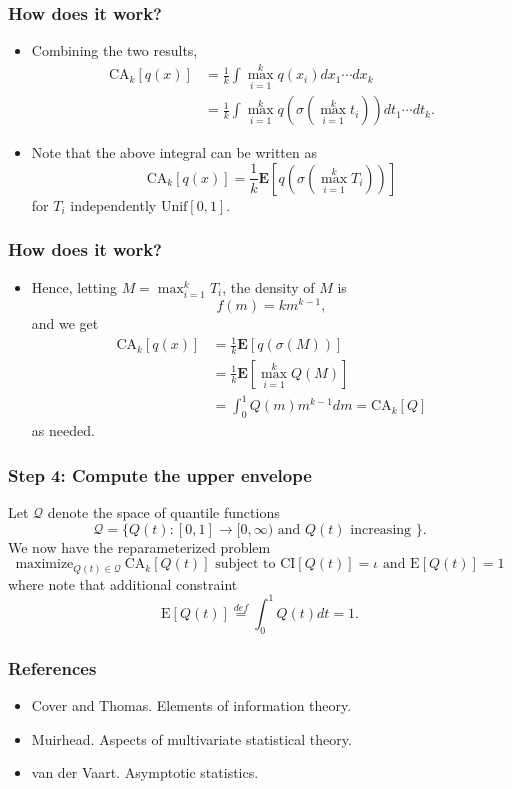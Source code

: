 \documentclass{beamer}
\newcommand{\E}{\textbf{E}}
\begin{document}
\begin{frame}
\frametitle{How does it work?}
\begin{itemize}
\item Combining the two results,
\begin{align*}
\text{CA}_k[q(x)] &= \frac{1}{k}\int \max_{i=1}^k q(x_i) dx_1 \cdots dx_k 
\\&= \frac{1}{k}\int \max_{i=1}^k q(\sigma(\max_{i=1}^k t_i)) dt_1 \cdots dt_k.
\end{align*}
\item Note that the above integral can be written as
\[
\text{CA}_k[q(x)] = \frac{1}{k}\E[q(\sigma(\max_{i=1}^k T_i))]
\]
for $T_i$ independently $\text{Unif}[0,1]$.
\end{itemize}
\end{frame}

\begin{frame}
\frametitle{How does it work?}
\begin{itemize}
\item Hence, letting $M = \max_{i=1}^k T_i$, the density of $M$ is
\[
f(m) = k m^{k-1},
\]
and we get
\begin{align*}
\text{CA}_k[q(x)] &= \frac{1}{k}\E[q(\sigma(M))]
\\&= \frac{1}{k}\E[\max_{i=1}^k Q(M)]
\\&= \int_0^1 Q(m) m^{k-1}dm  = \text{CA}_k[Q]
\end{align*}
as needed.
\end{itemize}
\end{frame}

\begin{frame}
\frametitle{Step 4: Compute the upper envelope}
Let $\mathcal{Q}$ denote the space of quantile functions 
\[\mathcal{Q} = \{Q(t): [0,1] \to [0,\infty)\text{ and }Q(t)\text{ increasing }\}.\]
We now have the reparameterized problem
\[
\text{maximize}_{Q(t) \in \mathcal{Q}}\ \text{CA}_k[Q(t)] \text{ subject to }\text{CI}[Q(t)] = \iota\text{ and }\text{E}[Q(t)] = 1
\]
where note that additional constraint
\[
\text{E}[Q(t)] \stackrel{def}{=} \int_0^1 Q(t) dt = 1.
\]
\end{frame}


\begin{frame}
\frametitle{References}
\begin{itemize}
\item Cover and Thomas.  Elements of information theory.
\item Muirhead.  Aspects of multivariate statistical theory.
\item van der Vaart.  Asymptotic statistics.
\end{itemize}
\end{frame}
\end{document}

